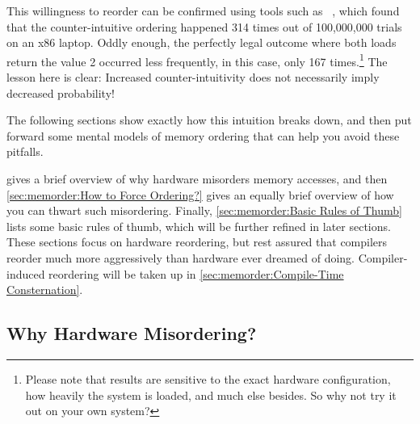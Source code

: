 \QuickQuizEnd

This willingness to reorder can be confirmed using tools such as
~\cite{Alglave:2014:HCM:2594291.2594347},
which found that the counter-intuitive ordering happened
314 times out of 100,000,000 trials on an x86 laptop.
Oddly enough, the perfectly legal outcome where both loads return the
value 2 occurred less frequently, in this case, only 167 times.\footnote{
	Please note that results are sensitive to the exact hardware
	configuration,
	how heavily the system is loaded, and much else besides.
	So why not try it out on your own system?}
The lesson here is clear:
Increased counter-intuitivity does not necessarily imply decreased probability!

The following sections show exactly how this intuition breaks down,
and then put forward some mental models of memory ordering that can help
you avoid these pitfalls.

gives a brief overview of why hardware misorders memory accesses, and then
\cref{sec:memorder:How to Force Ordering?}
gives an equally brief overview of how you can thwart such misordering.
Finally, \cref{sec:memorder:Basic Rules of Thumb}
lists some basic rules of thumb, which will be further refined in
later sections.
These sections focus on hardware reordering, but rest assured that compilers
reorder much more aggressively than hardware ever dreamed of doing.
Compiler-induced reordering will be taken up in
\cref{sec:memorder:Compile-Time Consternation}.

\subsection{Why Hardware Misordering?}
\label{sec:memorder:Why Hardware Misordering?}

